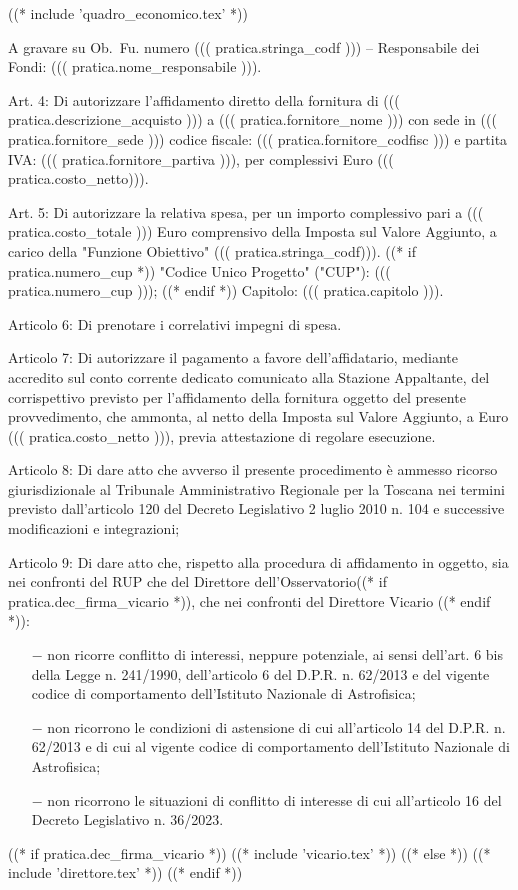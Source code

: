 ((* include 'quadro_economico.tex' *))

A gravare su Ob.~Fu. numero ((( pratica.stringa_codf ))) – Responsabile dei
Fondi: ((( pratica.nome_responsabile ))).

Art. 4: Di autorizzare l'affidamento diretto della fornitura di ((( pratica.descrizione_acquisto ))) a
((( pratica.fornitore_nome ))) con sede in  ((( pratica.fornitore_sede )))
codice fiscale: ((( pratica.fornitore_codfisc ))) e partita IVA:
((( pratica.fornitore_partiva ))), per complessivi Euro ((( pratica.costo_netto))).

Art. 5: Di autorizzare la relativa spesa, per un importo complessivo
pari a ((( pratica.costo_totale ))) Euro comprensivo della Imposta sul
Valore Aggiunto, a carico della "Funzione Obiettivo" ((( pratica.stringa_codf))).
((* if pratica.numero_cup *)) "Codice Unico Progetto" ("CUP"): ((( pratica.numero_cup ))); ((* endif *))
Capitolo: ((( pratica.capitolo ))).

Articolo 6: Di prenotare i correlativi impegni di spesa.

Articolo 7: Di autorizzare il pagamento a favore dell'affidatario,
mediante accredito sul conto corrente dedicato comunicato alla Stazione
Appaltante, del corrispettivo previsto per l'affidamento della
fornitura oggetto del presente provvedimento, che ammonta, al netto
della Imposta sul Valore Aggiunto, a Euro ((( pratica.costo_netto ))),
previa attestazione di regolare esecuzione.

Articolo 8: Di dare atto che avverso il presente procedimento è ammesso
ricorso giurisdizionale al Tribunale Amministrativo Regionale per la
Toscana nei termini previsto dall'articolo 120 del Decreto Legislativo
2 luglio 2010 n. 104 e successive modificazioni e integrazioni;

Articolo 9: Di dare atto che, rispetto alla procedura di affidamento in
oggetto, sia nei confronti del RUP che del Direttore
dell'Osservatorio((* if pratica.dec_firma_vicario *)), che nei confronti del Direttore Vicario ((* endif *)):

\begin{itemize}

\item[$-$]  non ricorre conflitto di interessi, neppure potenziale, ai
sensi dell'art. 6 bis della Legge n. 241/1990, dell'articolo 6 del
D.P.R. n. 62/2013 e del vigente codice di comportamento dell'Istituto
Nazionale di Astrofisica;

\item[$-$]  non ricorrono le condizioni di astensione di cui
all'articolo 14 del D.P.R. n. 62/2013 e di cui al vigente codice di
comportamento dell'Istituto Nazionale di Astrofisica;

\item[$-$] non ricorrono le situazioni di conflitto di interesse di cui
all'articolo 16 del Decreto Legislativo n. 36/2023.

\end{itemize}

((* if pratica.dec_firma_vicario *))
((* include 'vicario.tex' *))
((* else *))
((* include 'direttore.tex' *))
((* endif *))


